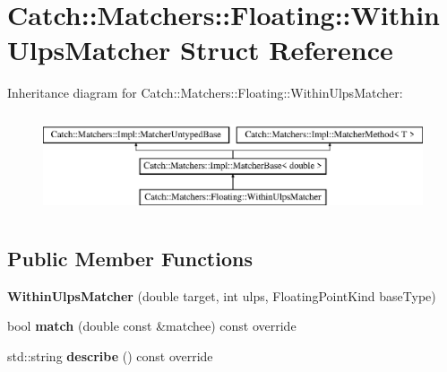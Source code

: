 \hypertarget{struct_catch_1_1_matchers_1_1_floating_1_1_within_ulps_matcher}{}\section{Catch\+:\+:Matchers\+:\+:Floating\+:\+:Within\+Ulps\+Matcher Struct Reference}
\label{struct_catch_1_1_matchers_1_1_floating_1_1_within_ulps_matcher}
Inheritance diagram for Catch\+:\+:Matchers\+:\+:Floating\+:\+:Within\+Ulps\+Matcher\+:\begin{figure}[H]
\begin{center}
\leavevmode
\includegraphics[height=2.968198cm]{struct_catch_1_1_matchers_1_1_floating_1_1_within_ulps_matcher}
\end{center}
\end{figure}
\subsection*{Public Member Functions}
\begin{DoxyCompactItemize}
\item 
\mbox{\label{struct_catch_1_1_matchers_1_1_floating_1_1_within_ulps_matcher_a836074ae4010275284ab66b2485c6575}} 
{\bfseries Within\+Ulps\+Matcher} (double target, int ulps, Floating\+Point\+Kind base\+Type)
\item 
\mbox{\label{struct_catch_1_1_matchers_1_1_floating_1_1_within_ulps_matcher_aabda42a0dc5d00f3c5916feb75006b32}} 
bool {\bfseries match} (double const \&matchee) const override
\item 
\mbox{\label{struct_catch_1_1_matchers_1_1_floating_1_1_within_ulps_matcher_ad9bc8bb7f3abd326580a4bf6cf369b1b}} 
std\+::string {\bfseries describe} () const override
\end{DoxyCompactItemize}

